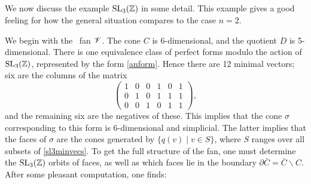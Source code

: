 \subsection{}\label{sl3}

We now discuss the example $\operatorname{SL}_{3} (\mathbb{Z})$ in some detail.  This
example gives a good feeling for how the general situation compares to
the case $n=2$.

We begin with the \Vor \ fan ${\mathscr V}$.  The cone $C$ is 6-dimensional, and
the quotient $D$ is 5-dimensional.  There is one equivalence class of
perfect forms modulo the action of $\operatorname{SL}_{3} (\mathbb{Z} )$, represented by the
form \eqref{anform}.  Hence there are 12 minimal vectors; six are the
columns of the matrix
\begin{equation}\label{sl3minvecs}
\left(
\begin{array}{cccccc}
1&0&0&1&0&1\\
0&1&0&1&1&1\\
0&0&1&0&1&1
\end{array}
 \right),
\end{equation}
and the remaining six are the negatives of these.  This implies that
the cone $\sigma$ corresponding to this form is 6-dimensional and
simplicial.  The latter implies that the faces of $\sigma$ are the
cones generated by $\{q (v)\mid v\in S \}$, where $S$ ranges over all
subsets of \eqref{sl3minvecs}.  To get the full structure of the fan,
one must determine the $\operatorname{SL}_{3} (\mathbb{Z})$ orbits of faces, as well as
which faces lie in the boundary $\partial \bar C = \bar C
\smallsetminus C$.  After some pleasant computation, one finds:
